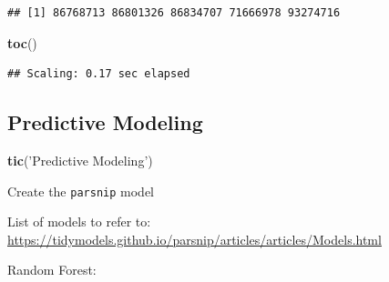 \documentclass[
]{book}
\newenvironment{Shaded}{\begin{snugshade}}{\end{snugshade}}
\newcommand{\DecValTok}[1]{\textcolor[rgb]{0.00,0.00,0.81}{#1}}
\newcommand{\KeywordTok}[1]{\textcolor[rgb]{0.13,0.29,0.53}{\textbf{#1}}}
\newcommand{\NormalTok}[1]{#1}
\newcommand{\OperatorTok}[1]{\textcolor[rgb]{0.81,0.36,0.00}{\textbf{#1}}}
\newcommand{\StringTok}[1]{\textcolor[rgb]{0.31,0.60,0.02}{#1}}
\begin{document}
\begin{Shaded}
\end{Shaded}

\begin{verbatim}
## [1] 86768713 86801326 86834707 71666978 93274716
\end{verbatim}

\begin{Shaded}
\begin{Highlighting}[]
\KeywordTok{toc}\NormalTok{()}
\end{Highlighting}
\end{Shaded}

\begin{verbatim}
## Scaling: 0.17 sec elapsed
\end{verbatim}

\hypertarget{predictive-modeling}{%
\subsection{Predictive Modeling}\label{predictive-modeling}}

\begin{Shaded}
\begin{Highlighting}[]
\KeywordTok{tic}\NormalTok{(}\StringTok{'Predictive Modeling'}\NormalTok{)}
\end{Highlighting}
\end{Shaded}

Create the \texttt{parsnip} \citep{R-parsnip} model

\begin{Shaded}
\end{Shaded}

List of models to refer to: \url{https://tidymodels.github.io/parsnip/articles/articles/Models.html}

Random Forest:
\end{document}
